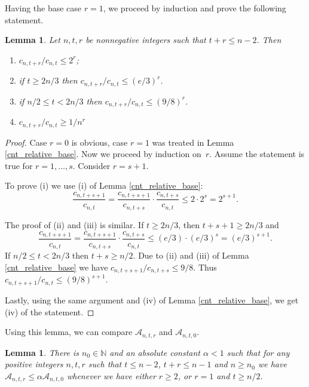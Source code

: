 \documentclass[11pt,letterpaper]{amsart}
\renewcommand{\le}{\leqslant}
\renewcommand{\ge}{\geqslant}
\newcommand{\aaa}{\mathcal{A}}
\newtheorem{lemma}[theorem]{Lemma}
\begin{document}
Having the base case $r=1$, we proceed by induction and prove the following statement.

\begin{lemma}\label{cnt_relative}
    Let $n,t, r$ be nonnegative integers such that $t + r\le n - 2$. Then 
    \begin{enumerate}[label=(\roman*)]
        \item $c_{n, t+r}/c_{n, t} \le 2^r$;
        \item if $t \ge 2n/3$ then $c_{n, t+r}/c_{n, t} \le (e/3)^r$.
        \item if $n/2 \le t < 2n/3$ then $c_{n, t+r}/c_{n, t} \le (9/8)^r$.
        \item $c_{n, t+r}/c_{n, t} \ge 1/n^r$
    \end{enumerate}
\end{lemma}

\begin{proof}
    Case $r = 0$ is obvious, case $r = 1$ was treated in Lemma \ref{cnt_relative_base}. Now we proceed by induction on~$r$. Assume the statement is true for $r = 1, \ldots, s$. Consider $r = s+1$.

    To prove (i) we use (i) of Lemma \ref{cnt_relative_base}: $$\frac{c_{n, t+s+1}}{c_{n, t}} = \frac{c_{n, t+s+1}}{c_{n, t+s}} \cdot \frac{c_{n, t+s}}{c_{n, t}} \le 2\cdot 2^{s} = 2^{s+1}.$$

    The proof of (ii) and (iii) is similar. If $t \ge 2n/3$, then $t + s + 1 \ge 2n/3$ and $$\frac{c_{n, t+s+1}}{c_{n, t}} = \frac{c_{n, t+s+1}}{c_{n, t+s}} \cdot \frac{c_{n, t+s}}{c_{n, t}} \le (e/3)\cdot (e/3)^{s} = (e/3)^{s+1}.$$ If $n/2 \le t < 2n/3$ then $t+s \ge n/2$. Due to (ii) and (iii) of Lemma \ref{cnt_relative_base} we have $c_{n, t+s+1}/c_{n, t+s} \le 9/8$. Thus $c_{n, t+s+1}/c_{n, t} \le (9/8)^{s+1}$.

    Lastly, using the same argument and (iv) of Lemma \ref{cnt_relative_base}, we get (iv) of the statement.
\end{proof}

Using this lemma, we can compare $\aaa_{n, t, r}$ and $\aaa_{n, t, 0}$. 
\begin{lemma}\label{antr_relative}
    There is $n_0 \in \mathbb{N}$ and an absolute constant $\alpha < 1$ such that for any positive integers $n,t, r$ such that $t\le n-2$, $t+r\le n-1$ and $n\ge n_0$ we have $\aaa_{n, t, r} \le \alpha \aaa_{n, t, 0}$ whenever we have either $r \ge 2$, or $r=1$ and $t\ge n/2$.
\end{lemma}
\end{document}
